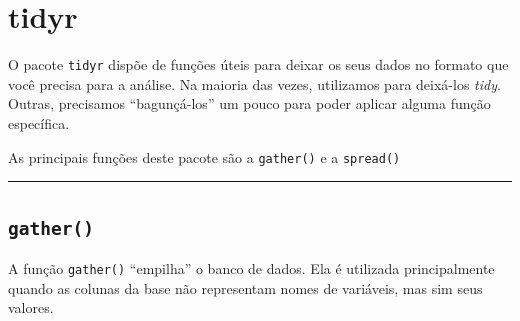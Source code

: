 \documentclass[
]{book}
\begin{document}
\hypertarget{tidyr}{%
\section{tidyr}\label{tidyr}}

O pacote \texttt{tidyr} dispõe de funções úteis para deixar os seus dados no formato que você precisa para a análise. Na maioria das vezes, utilizamos para deixá-los \emph{tidy}. Outras, precisamos ``bagunçá-los'' um pouco para poder aplicar alguma função específica.

As principais funções deste pacote são a \texttt{gather()} e a \texttt{spread()}

\begin{center}\rule{0.5\linewidth}{0.5pt}\end{center}

\hypertarget{gather}{%
\subsection{\texorpdfstring{\texttt{gather()}}{gather()}}\label{gather}}

A função \texttt{gather()} ``empilha'' o banco de dados. Ela é utilizada principalmente quando as colunas da base não representam nomes de variáveis, mas sim seus valores.
\end{document}
